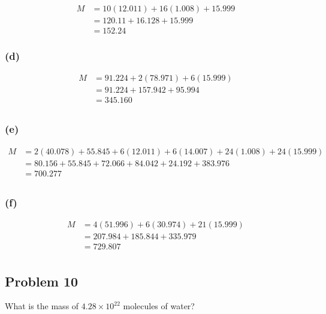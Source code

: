 \documentclass[11pt]{scrartcl}
\begin{document}
\begin{align*}
    M &= 10 \left (12.011 \right) + 16 \left (1.008 \right) + 15.999 \\
    &= 120.11 + 16.128 + 15.999 \\
    &= \boxed{152.24}
\end{align*}

\subsubsection{(d)}

\begin{align*}
    M &= 91.224 + 2 \left (78.971 \right) + 6 \left (15.999 \right) \\
    &= 91.224 + 157.942 + 95.994 \\
    &= \boxed{345.160} \\
\end{align*}


\subsubsection{(e)}

\begin{align*}
    M &= 2 \left (40.078 \right) + 55.845 + 6 \left (12.011 \right) + 6 \left (14.007 \right) + 24 \left (1.008 \right) + 24 \left (15.999 \right) \\
    &= 80.156 + 55.845 + 72.066 + 84.042 + 24.192 + 383.976 \\
    &= \boxed{700.277} \\
\end{align*}

\subsubsection{(f)}


\begin{align*}
    M &= 4 \left (51.996 \right) + 6 \left (30.974 \right) + 21 \left (15.999 \right) \\
    &= 207.984 + 185.844 + 335.979 \\
    &= \boxed{729.807} \\
\end{align*}

\newpage
\subsection{Problem 10}
What is the mass of $4.28 \times 10^{22}$ molecules of water?
\end{document}
